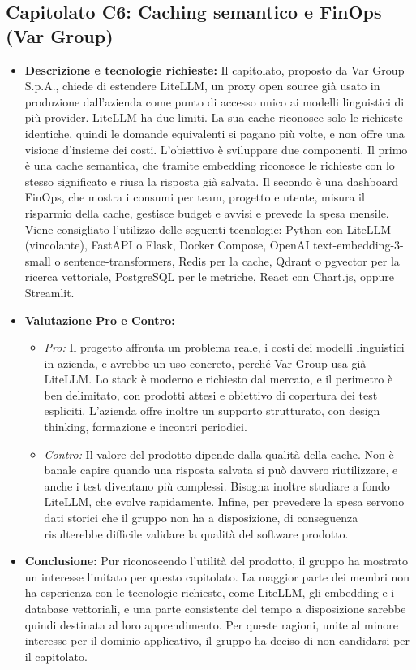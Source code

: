 \documentclass[12pt,a4paper]{article}
\newcommand{\tightlist}{\setlength{\itemsep}{1pt}\setlength{\parskip}{0pt}}
\begin{document}
\hypertarget{capitolato-c6}{%
\subsection{Capitolato C6: Caching semantico e FinOps (Var Group)}}
\begin{itemize}
\tightlist
\item \textbf{Descrizione e tecnologie richieste:} Il capitolato, proposto da Var Group S.p.A., chiede di estendere LiteLLM, un proxy open source già usato in produzione dall’azienda come punto di accesso unico ai modelli linguistici di più provider. LiteLLM ha due limiti. La sua cache riconosce solo le richieste identiche, quindi le domande equivalenti si pagano più volte, e non offre una visione d’insieme dei costi.
L’obiettivo è sviluppare due componenti. Il primo è una cache semantica, che tramite embedding riconosce le richieste con lo stesso significato e riusa la risposta già salvata. Il secondo è una dashboard FinOps, che mostra i consumi per team, progetto e utente, misura il risparmio della cache, gestisce budget e avvisi e prevede la spesa mensile.
Viene consigliato l’utilizzo delle seguenti tecnologie:
Python con LiteLLM (vincolante), FastAPI o Flask, Docker Compose, OpenAI text-embedding-3-small o sentence-transformers, Redis per la cache, Qdrant o pgvector per la ricerca vettoriale, PostgreSQL per le metriche, React con Chart.js, oppure Streamlit.


\item \textbf{Valutazione Pro e Contro:}
  \begin{itemize}
  \tightlist
  \item \emph{Pro:} Il progetto affronta un problema reale, i costi dei modelli linguistici in azienda, e avrebbe un uso concreto, perché Var Group usa già LiteLLM. Lo stack è moderno e richiesto dal mercato, e il perimetro è ben delimitato, con prodotti attesi e obiettivo di copertura dei test espliciti. L’azienda offre inoltre un supporto strutturato, con design thinking, formazione e incontri periodici.
  \item \emph{Contro:} Il valore del prodotto dipende dalla qualità della cache. Non è banale capire quando una risposta salvata si può davvero riutilizzare, e anche i test diventano più complessi. Bisogna inoltre studiare a fondo LiteLLM, che evolve rapidamente. Infine, per prevedere la spesa servono dati storici che il gruppo non ha a disposizione, di conseguenza risulterebbe difficile validare la qualità del software prodotto.

  \end{itemize}
\item \textbf{Conclusione:} Pur riconoscendo l’utilità del prodotto, il gruppo ha mostrato un interesse limitato per questo capitolato. La maggior parte dei membri non ha esperienza con le tecnologie richieste, come LiteLLM, gli embedding e i database vettoriali, e una parte consistente del tempo a disposizione sarebbe quindi destinata al loro apprendimento. Per queste ragioni, unite al minore interesse per il dominio applicativo, il gruppo ha deciso di non candidarsi per il capitolato. 

\end{itemize}
\end{document}
